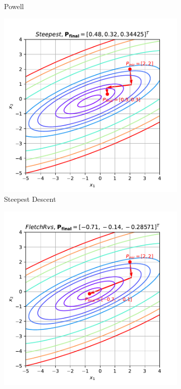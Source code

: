\documentclass[10pt, a4paper]{article}
\begin{document}
\begin{figure}[htpb]
\begin{subfigure}[b]{0.32\textwidth}
    \caption{Powell}
    \label{fig:q1_powell}
  \end{subfigure}
  \hfill
  \begin{subfigure}[b]{0.32\textwidth}
    \centering
    \includegraphics[width=\textwidth]{images/q1_Steepest.pdf}
    \caption{Steepest Descent}
    \label{fig:q1_steepest}
  \end{subfigure}
  \hfill
  \begin{subfigure}[b]{0.32\textwidth}
    \centering
    \includegraphics[width=\textwidth]{images/q1_FletchRvs.pdf}

\end{subfigure}
\end{figure}
\end{document}
